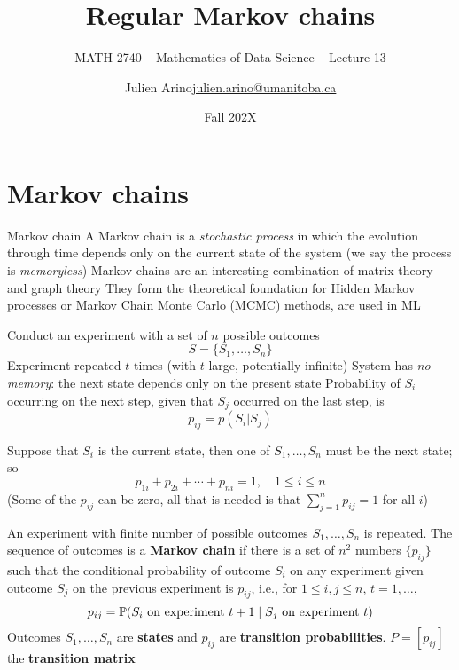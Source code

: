 \documentclass[aspectratio=169]{beamer}\usepackage[]{graphicx}\usepackage[]{xcolor}
\subtitle{MATH 2740 -- Mathematics of Data Science -- Lecture 13}
\author{\texorpdfstring{Julien Arino\newline\url{julien.arino@umanitoba.ca}}{Julien Arino}}
\institute{Department of Mathematics @ University of Manitoba}
\date{Fall 202X}
\title{Regular Markov chains}
\begin{document}


\section{Markov chains}

\begin{frame}{Markov chain}
	A Markov chain is a \emph{stochastic process} in which the evolution through time depends only on the current state of the system (we say the process is \emph{memoryless})
	\vfill
	Markov chains are an interesting combination of matrix theory and graph theory
	\vfill
	They form the theoretical foundation for Hidden Markov processes or Markov Chain Monte Carlo (MCMC) methods, are used in ML
\end{frame}



\begin{frame}
Conduct an experiment with a set of $n$ possible outcomes
\[
S=\{S_1,\dots, S_n\}
\]
\vfill
Experiment repeated $t$ times (with $t$ large, potentially infinite)
\vfill 
System has \emph{no memory}: the next state depends only on the present state
\vfill
Probability of $S_i$ occurring on the next step, given that $S_j$ occurred on the last step, is
\[
p_{ij}=p(S_i|S_j)
\]
\end{frame}


\begin{frame} 
Suppose that $S_i$ is the current state, then one of $S_1, \ldots,S_n$ must be the next state; so
\[
p_{1i}+p_{2i}+\cdots+p_{ni}=1, \quad 1\leq i\leq n
\]
(Some of the $p_{ij}$ can be zero, all that is needed is that $\sum_{j=1}^n p_{ij}=1$ for all $i$)
\vfill
\begin{definition}
An experiment with finite number of possible outcomes $S_1,\ldots,S_n$ is repeated. The sequence of outcomes is a \textbf{Markov chain} if there is a set of $n^2$ numbers $\{p_{ij}\}$ such that the conditional probability of outcome $S_i$ on any experiment given outcome $S_j$ on the previous experiment is $p_{ij}$, i.e., for $1\leq i,j\leq n$, $t=1,\ldots$,
\[
	p_{ij}=\mathbb{P}(S_i\textrm{ on experiment }t+1\;|\;
	S_j\textrm{ on experiment }t)	
\]
Outcomes $S_1,\ldots,S_n$ are \textbf{states} and $p_{ij}$ are \textbf{transition probabilities}. $P=[p_{ij}]$ the \textbf{transition matrix}
\end{definition}
\end{frame}
\end{document}
